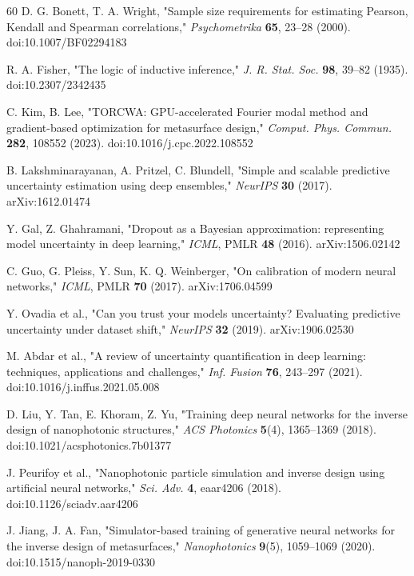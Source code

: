 \documentclass[11pt,a4paper]{article}
\begin{document}
\begin{thebibliography}{60}
D. G. Bonett, T. A. Wright, "Sample size requirements for estimating Pearson, Kendall and Spearman correlations," \emph{Psychometrika} \textbf{65}, 23--28 (2000). doi:10.1007/BF02294183

R. A. Fisher, "The logic of inductive inference," \emph{J. R. Stat. Soc.} \textbf{98}, 39--82 (1935). doi:10.2307/2342435

C. Kim, B. Lee, "TORCWA: GPU-accelerated Fourier modal method and gradient-based optimization for metasurface design," \emph{Comput. Phys. Commun.} \textbf{282}, 108552 (2023). doi:10.1016/j.cpc.2022.108552

B. Lakshminarayanan, A. Pritzel, C. Blundell, "Simple and scalable predictive uncertainty estimation using deep ensembles," \emph{NeurIPS} \textbf{30} (2017). arXiv:1612.01474

Y. Gal, Z. Ghahramani, "Dropout as a Bayesian approximation: representing model uncertainty in deep learning," \emph{ICML}, PMLR \textbf{48} (2016). arXiv:1506.02142

C. Guo, G. Pleiss, Y. Sun, K. Q. Weinberger, "On calibration of modern neural networks," \emph{ICML}, PMLR \textbf{70} (2017). arXiv:1706.04599

Y. Ovadia et al., "Can you trust your model\textquotesingle s uncertainty? Evaluating predictive uncertainty under dataset shift," \emph{NeurIPS} \textbf{32} (2019). arXiv:1906.02530

M. Abdar et al., "A review of uncertainty quantification in deep learning: techniques, applications and challenges," \emph{Inf. Fusion} \textbf{76}, 243--297 (2021). doi:10.1016/j.inffus.2021.05.008

D. Liu, Y. Tan, E. Khoram, Z. Yu, "Training deep neural networks for the inverse design of nanophotonic structures," \emph{ACS Photonics} \textbf{5}(4), 1365--1369 (2018). doi:10.1021/acsphotonics.7b01377

J. Peurifoy et al., "Nanophotonic particle simulation and inverse design using artificial neural networks," \emph{Sci. Adv.} \textbf{4}, eaar4206 (2018). doi:10.1126/sciadv.aar4206

J. Jiang, J. A. Fan, "Simulator-based training of generative neural networks for the inverse design of metasurfaces," \emph{Nanophotonics} \textbf{9}(5), 1059--1069 (2020). doi:10.1515/nanoph-2019-0330


\end{thebibliography}
\end{document}
